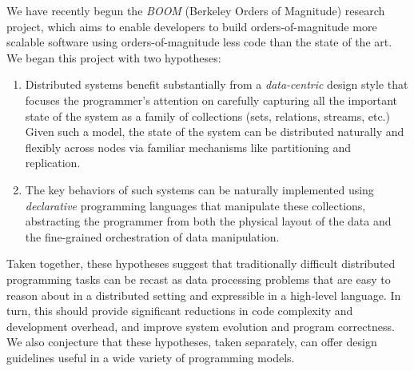We have recently begun the \emph{BOOM} (Berkeley Orders of Magnitude) research
project, which aims to enable developers to build orders-of-magnitude more
scalable software using orders-of-magnitude less code than the state of the
art. We began this project with two hypotheses:
\begin{enumerate}
\item
  Distributed systems benefit substantially from a \emph{data-centric} design
  style that focuses the programmer's attention on carefully capturing all the
  important state of the system as a family of collections (sets, relations,
  streams, etc.)  Given such a model, the state of the system can be distributed
  naturally and flexibly across nodes via familiar mechanisms like partitioning
  and replication.
\item The key behaviors of such systems can be naturally implemented using
  \emph{declarative} programming languages that manipulate these collections,
abstracting the programmer from
  both the physical layout of the data and the fine-grained orchestration of
  data manipulation.
\end{enumerate}
Taken together, these hypotheses suggest that traditionally difficult
distributed programming tasks can be recast as data processing problems that are
easy to reason about in a distributed setting and expressible in a high-level
language.  In turn, this should provide significant reductions in code
complexity and development overhead, and improve system evolution and program
correctness.  We also conjecture that these hypotheses, taken separately, can
offer design guidelines useful in a wide variety of programming models.




